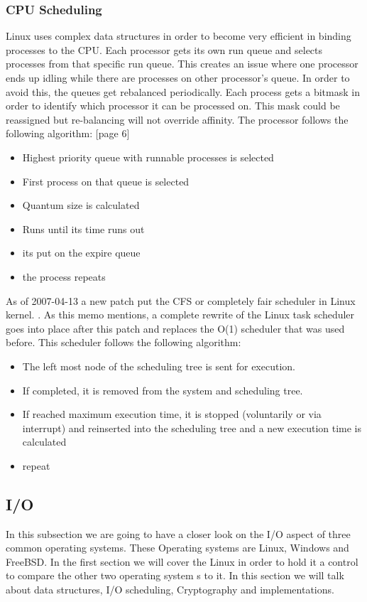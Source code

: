 \documentclass[journal,10pt,onecolumn,compsoc,letterpaper,draftclsnofoot,table,xcdraw]{IEEEtran} \usepackage[margin=0.75in]{geometry}
\begin{document}
\subsubsection{CPU Scheduling}
\noindent Linux uses complex data structures in order to become very efficient in binding processes to the CPU. Each processor gets its own run queue and selects processes from that specific run queue. This creates an issue where one processor ends up idling while there are processes on other processor's queue. In order to avoid this, the queues get rebalanced periodically. Each process gets a bitmask in order to identify which processor it can be processed on. This mask could be reassigned but re-balancing will not override affinity. The processor follows the following algorithm: \cite{cscedu}[page 6]
\begin{itemize}
\item Highest priority queue with runnable processes is selected
\item First process on that queue is selected
\item Quantum size is calculated
\item Runs until its time runs out
\item its put on the expire queue
\item the process repeats
\end{itemize}
\noindent As of 2007-04-13 a new patch put the CFS or completely fair scheduler in Linux kernel. \cite{cfsmemo}. As this memo mentions, a complete rewrite of the Linux task scheduler goes into place after this patch and replaces the O(1) scheduler that was used before. This scheduler follows the following algorithm: \cite{cfshw}
\begin{itemize}
\item The left most node of the scheduling tree is sent for execution.
\item If completed, it is removed from the system and scheduling tree.
\item If reached maximum execution time, it is stopped (voluntarily or via interrupt) and reinserted into the scheduling tree and a new execution time is calculated
\item repeat
\end{itemize}

\subsection{I/O}
\noindent In this subsection we are going to have a closer look on the I/O aspect of three common operating systems. These Operating systems are Linux, Windows and FreeBSD. In the first section we will cover the Linux in order to hold it a control to compare the other two operating system s to it. In this section we will talk about data structures, I/O scheduling, Cryptography and implementations.
\end{document}
